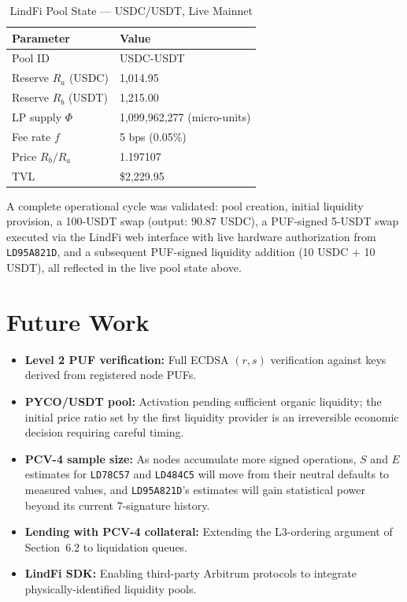 \documentclass[11pt,a4paper]{article}
\begin{document}
\begin{table}[H]
\centering
\caption{LindFi Pool State --- USDC/USDT, Live Mainnet}
\label{tab:pool_state}
\begin{tabular}{@{}ll@{}}
\toprule
\textbf{Parameter} & \textbf{Value} \\
\midrule
Pool ID & USDC-USDT \\
Reserve $R_a$ (USDC) & 1,014.95 \\
Reserve $R_b$ (USDT) & 1,215.00 \\
LP supply $\Phi$ & 1,099,962,277 (micro-units) \\
Fee rate $f$ & 5 bps (0.05\%) \\
Price $R_b/R_a$ & 1.197107 \\
TVL & \$2,229.95 \\
\bottomrule
\end{tabular}
\end{table}

A complete operational cycle was validated: pool creation, initial liquidity provision, a 100-USDT swap (output: 90.87 USDC), a PUF-signed 5-USDT swap executed via the LindFi web interface with live hardware authorization from \texttt{LD95A821D}, and a subsequent PUF-signed liquidity addition (10 USDC + 10 USDT), all reflected in the live pool state above.

\section{Future Work}

\begin{itemize}
    \item \textbf{Level 2 PUF verification:} Full ECDSA $(r,s)$ verification against keys derived from registered node PUFs.
    \item \textbf{PYCO/USDT pool:} Activation pending sufficient organic liquidity; the initial price ratio set by the first liquidity provider is an irreversible economic decision requiring careful timing.
    \item \textbf{PCV-4 sample size:} As nodes accumulate more signed operations, $S$ and $E$ estimates for \texttt{LD78C57} and \texttt{LD484C5} will move from their neutral defaults to measured values, and \texttt{LD95A821D}'s estimates will gain statistical power beyond its current 7-signature history.
    \item \textbf{Lending with PCV-4 collateral:} Extending the L3-ordering argument of Section~6.2 to liquidation queues.
    \item \textbf{LindFi SDK:} Enabling third-party Arbitrum protocols to integrate physically-identified liquidity pools.
\end{itemize}
\end{document}
